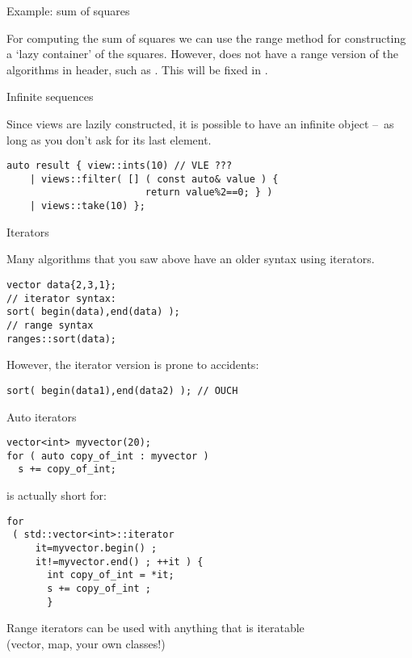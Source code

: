  {Example: sum of squares}

For computing the sum of squares
we can use the range  method
for constructing a `lazy container' of the squares.
However,  does not have a range version
of the algorithms in  header,
such as . This will be fixed in .


 {Infinite sequences}

Since views are lazily constructed,
it is possible to have an infinite object
--~as long as you don't ask for its last element.
\begin{lstlisting}
auto result { view::ints(10) // VLE ???
    | views::filter( [] ( const auto& value ) {
                        return value%2==0; } )
    | views::take(10) };
\end{lstlisting}

 {Iterators}
\label{sec:iterator}
\label{sec:iterator-use}

Many algorithms that you saw above
have an older syntax using iterators.

\begin{lstlisting}
vector data{2,3,1};
// iterator syntax:
sort( begin(data),end(data) );
// range syntax
ranges::sort(data);
\end{lstlisting}

However, the iterator version is prone to accidents:
\begin{lstlisting}
sort( begin(data1),end(data2) ); // OUCH
\end{lstlisting}

\begin{block}{Auto iterators}
  \label{sl:auto-iterator}
  \begin{multicols}{2}
\begin{lstlisting}
vector<int> myvector(20);
for ( auto copy_of_int : myvector )
  s += copy_of_int;
\end{lstlisting}
    is actually short for:
\begin{lstlisting}
for
 ( std::vector<int>::iterator
     it=myvector.begin() ;
     it!=myvector.end() ; ++it ) {
       int copy_of_int = *it;
       s += copy_of_int ;
       }
\end{lstlisting}
  \end{multicols}
  Range iterators can be used with anything that is iteratable\\
  (vector, map, your own classes!)
\end{block}


